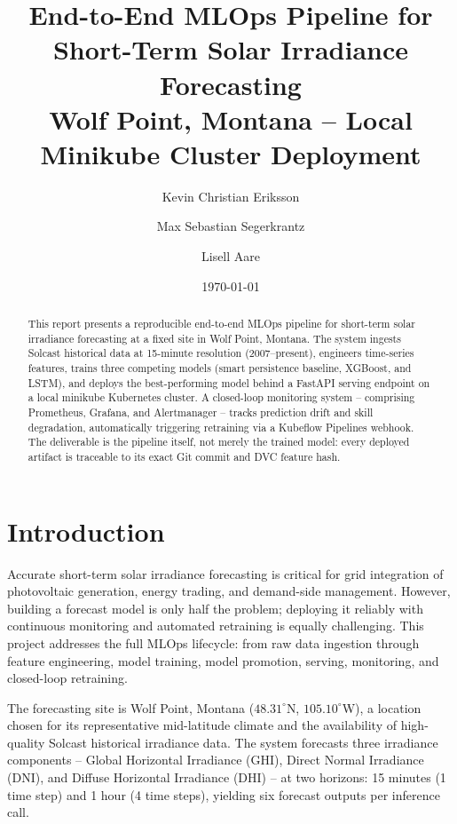 \documentclass[11pt,a4paper]{article}
\title{\textbf{End-to-End MLOps Pipeline for Short-Term Solar Irradiance Forecasting}\\[5pt]
\large Wolf Point, Montana  --  Local Minikube Cluster Deployment}
\author{Kevin Christian Eriksson \and Max Sebastian Segerkrantz \and Lisell Aare}
\date{\today}
\begin{document}
\maketitle

\begin{abstract}
This report presents a reproducible end-to-end MLOps pipeline for short-term solar irradiance forecasting at a fixed site in Wolf Point, Montana. The system ingests Solcast historical data at 15-minute resolution (2007--present), engineers time-series features, trains three competing models (smart persistence baseline, XGBoost, and LSTM), and deploys the best-performing model behind a FastAPI serving endpoint on a local minikube Kubernetes cluster. A closed-loop monitoring system -- comprising Prometheus, Grafana, and Alertmanager -- tracks prediction drift and skill degradation, automatically triggering retraining via a Kubeflow Pipelines webhook. The deliverable is the pipeline itself, not merely the trained model: every deployed artifact is traceable to its exact Git commit and DVC feature hash.
\end{abstract}

\section{Introduction}

Accurate short-term solar irradiance forecasting is critical for grid integration of photovoltaic generation, energy trading, and demand-side management. However, building a forecast model is only half the problem; deploying it reliably with continuous monitoring and automated retraining is equally challenging. This project addresses the full MLOps lifecycle: from raw data ingestion through feature engineering, model training, model promotion, serving, monitoring, and closed-loop retraining.

The forecasting site is Wolf Point, Montana ($48.31^\circ$N, $105.10^\circ$W), a location chosen for its representative mid-latitude climate and the availability of high-quality Solcast historical irradiance data. The system forecasts three irradiance components -- Global Horizontal Irradiance (GHI), Direct Normal Irradiance (DNI), and Diffuse Horizontal Irradiance (DHI) -- at two horizons: 15 minutes (1 time step) and 1 hour (4 time steps), yielding six forecast outputs per inference call.
\end{document}
